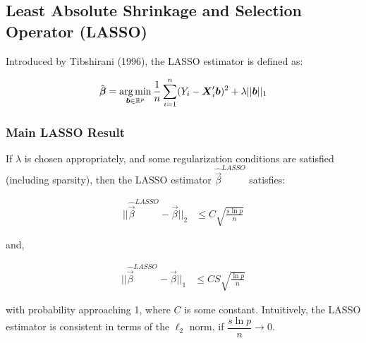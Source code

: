 \subsection{Least Absolute Shrinkage and Selection Operator (LASSO)}

Introduced by Tibshirani (1996), the LASSO estimator is defined as:

\begin{align*}
\hat{\boldsymbol{\beta}} = \operatorname*{arg\,min}_{\boldsymbol{b} \in \mathbb{R}^p} 
\frac{1}{n} \sum_{i=1}^n (Y_i - \boldsymbol{X}_i'\boldsymbol{b})^2 + \lambda ||\boldsymbol{b}||_1
\end{align*}

\subsubsection{Main LASSO Result}

If $\lambda$ is chosen appropriately, and some regularization conditions are satisfied (including sparsity), then the LASSO estimator $\hat{\Vec{\beta}}^{LASSO}$ satisfies:

\begin{align*}
||\hat{\Vec{\beta}}^{LASSO} - \Vec{\beta}||_2 &\leq C \sqrt{\frac{s \ln p}{n}}
\end{align*} 

and,

\begin{align*}
||\hat{\Vec{\beta}}^{LASSO} - \Vec{\beta}||_1 &\leq CS \sqrt{\frac{\ln p}{n}}
\end{align*} 

with probability approaching 1, where $C$ is some constant. Intuitively, the LASSO estimator is consistent in terms of the $\ell_2$ norm, if $\dfrac{s \ln p}{n} \to 0$.